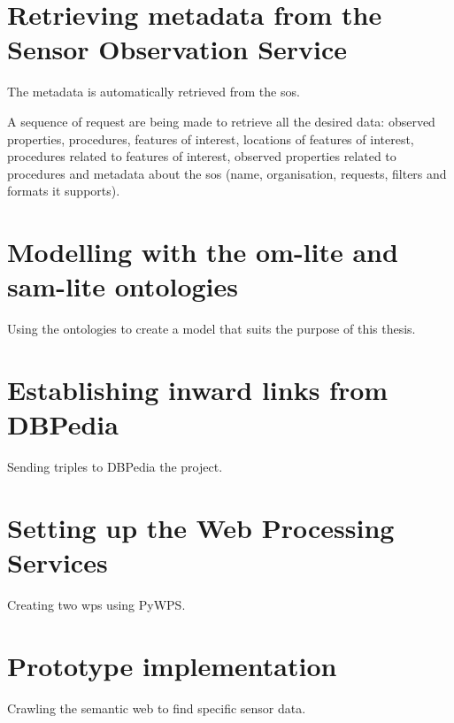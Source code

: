 

\section{Retrieving metadata from the Sensor Observation Service}
The metadata is automatically retrieved from the \ac{sos}.

A sequence of request are being made to retrieve all the desired data: observed properties, procedures, features of interest, locations of features of interest, procedures related to features of interest, observed properties related to procedures and metadata about the \ac{sos} (name, organisation, requests, filters and formats it supports).


\section{Modelling with the om-lite and sam-lite ontologies}
Using the ontologies to create a model that suits the purpose of this thesis.

\section{Establishing inward links from DBPedia}
Sending triples to DBPedia the project.

\section{Setting up the Web Processing Services}
Creating two \ac{wps} using PyWPS.

\section{Prototype implementation}
Crawling the semantic web to find specific sensor data.
